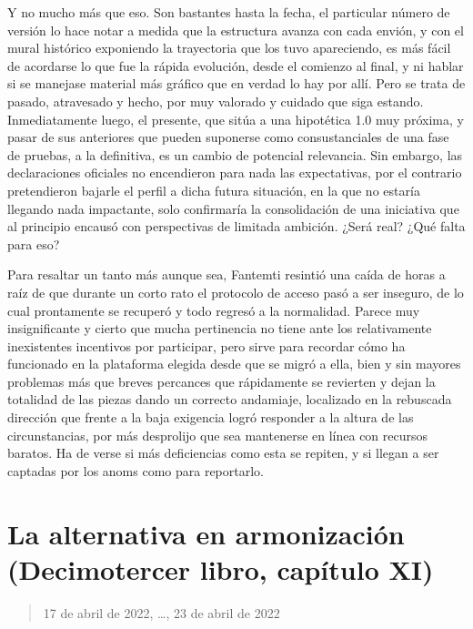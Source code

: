 \documentclass[
]{book}
\begin{document}
Y no mucho más que eso. Son bastantes hasta la fecha, el particular número de versión lo hace notar a medida que la estructura avanza con cada envión, y con el mural histórico exponiendo la trayectoria que los tuvo apareciendo, es más fácil de acordarse lo que fue la rápida evolución, desde el comienzo al final, y ni hablar si se manejase material más gráfico que en verdad lo hay por allí. Pero se trata de pasado, atravesado y hecho, por muy valorado y cuidado que siga estando. Inmediatamente luego, el presente, que sitúa a una hipotética 1.0 muy próxima, y pasar de sus anteriores que pueden suponerse como consustanciales de una fase de pruebas, a la definitiva, es un cambio de potencial relevancia. Sin embargo, las declaraciones oficiales no encendieron para nada las expectativas, por el contrario pretendieron bajarle el perfil a dicha futura situación, en la que no estaría llegando nada impactante, solo confirmaría la consolidación de una iniciativa que al principio encausó con perspectivas de limitada ambición. ¿Será real? ¿Qué falta para eso?

Para resaltar un tanto más aunque sea, Fantemti resintió una caída de horas a raíz de que durante un corto rato el protocolo de acceso pasó a ser inseguro, de lo cual prontamente se recuperó y todo regresó a la normalidad. Parece muy insignificante y cierto que mucha pertinencia no tiene ante los relativamente inexistentes incentivos por participar, pero sirve para recordar cómo ha funcionado en la plataforma elegida desde que se migró a ella, bien y sin mayores problemas más que breves percances que rápidamente se revierten y dejan la totalidad de las piezas dando un correcto andamiaje, localizado en la rebuscada dirección que frente a la baja exigencia logró responder a la altura de las circunstancias, por más desprolijo que sea mantenerse en línea con recursos baratos. Ha de verse si más deficiencias como esta se repiten, y si llegan a ser captadas por los anoms como para reportarlo.

\hypertarget{la-alternativa-en-armonizaciuxf3n-decimotercer-libro-capuxedtulo-xi}{%
\section{La alternativa en armonización (Decimotercer libro, capítulo XI)}\label{la-alternativa-en-armonizaciuxf3n-decimotercer-libro-capuxedtulo-xi}}

\begin{quote}
17 de abril de 2022, \ldots, 23 de abril de 2022
\end{quote}
\end{document}
